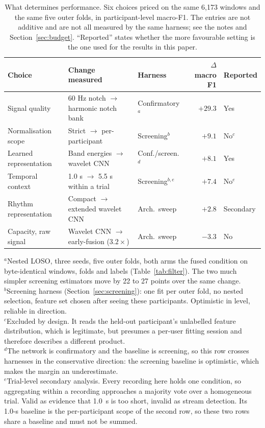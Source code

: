 \documentclass[pdflatex,sn-nature,iicol]{sn-jnl}
\begin{document}
\begin{table}[t]
  \centering
  \caption{What determines performance. Six choices priced on the same 6,173 windows and the same five outer folds, in participant-level macro-F1. The entries are not additive and are not all measured by the same harness; see the notes and Section~\ref{sec:budget}. ``Reported'' states whether the more favourable setting is the one used for the results in this paper.}
  \label{tab:budget}
  \footnotesize
  \begin{tabular*}{\textwidth}{@{\extracolsep{\fill}}lllrl@{}}
    \toprule
    Choice & Change measured & Harness & $\Delta$ macro F1 & Reported \\
    \midrule
    Signal quality & 60 Hz notch $\rightarrow$ harmonic notch bank & Confirmatory$^{a}$ & $+29.3$ & Yes \\
    Normalisation scope & Strict $\rightarrow$ per-participant & Screening$^{b}$ & $+9.1$ & No$^{c}$ \\
    Learned representation & Band energies $\rightarrow$ wavelet CNN & Conf./screen.$^{d}$ & $+8.1$ & Yes \\
    Temporal context & 1.0 s $\rightarrow$ 5.5 s within a trial & Screening$^{b,e}$ & $+7.4$ & No$^{e}$ \\
    Rhythm representation & Compact $\rightarrow$ extended wavelet CNN & Arch.\ sweep & $+2.8$ & Secondary \\
    Capacity, raw signal & Wavelet CNN $\rightarrow$ early-fusion ($3.2\times$) & Arch.\ sweep & $-3.3$ & No \\
    \bottomrule
  \end{tabular*}
  \begin{flushleft}\footnotesize
  $^{a}$Nested LOSO, three seeds, five outer folds, both arms the fused condition on byte-identical windows, folds and labels (Table~\ref{tab:filter}). The two much simpler screening estimators move by 22 to 27 points over the same change.\\
  $^{b}$Screening harness (Section~\ref{sec:screening}): one fit per outer fold, no nested selection, feature set chosen after seeing these participants. Optimistic in level, reliable in direction.\\
  $^{c}$Excluded by design. It reads the held-out participant's unlabelled feature distribution, which is legitimate, but presumes a per-user fitting session and therefore describes a different product.\\
  $^{d}$The network is confirmatory and the baseline is screening, so this row crosses harnesses in the conservative direction: the screening baseline is optimistic, which makes the margin an underestimate.\\
  $^{e}$Trial-level secondary analysis. Every recording here holds one condition, so aggregating within a recording approaches a majority vote over a homogeneous trial. Valid as evidence that 1.0~s is too short, invalid as stream detection. Its 1.0-s baseline is the per-participant scope of the second row, so these two rows share a baseline and must not be summed.
  \end{flushleft}
\end{table}
\end{document}
